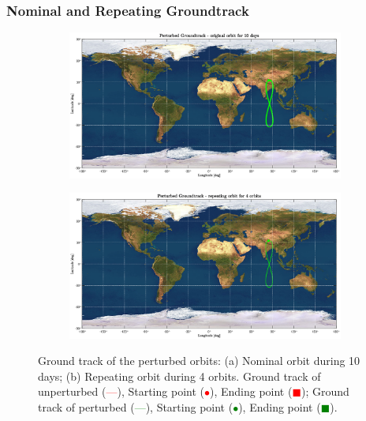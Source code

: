 \documentclass{article}
\newcommand{\reddashedline}{\textcolor{red}{---}}
\newcommand{\greendashedline}{\textcolor{green}{---}}
\begin{document}

\subsubsection{Nominal and Repeating Groundtrack}

\begin{figure}[H]
	\centering
	\begin{subfigure}[b]{0.45\textwidth}
		\includegraphics[width=\textwidth]{pg10d.eps}
		\caption{}
		\label{fig:1a}
	\end{subfigure}
	\hfill
	\begin{subfigure}[b]{0.45\textwidth}
		\includegraphics[width=\textwidth]{pgro4orb.eps}
		\caption{}
		\label{fig:1b}
	\end{subfigure}
	
	\caption{Ground track of the perturbed orbits: (a) Nominal orbit during 10 days; (b) Repeating orbit during 4 orbits. Ground track of unperturbed (\reddashedline), Starting point (\textcolor{red}{$\bullet$}), Ending point (\textcolor{red}{$\blacksquare$}); Ground track of perturbed (\greendashedline), Starting point (\textcolor{green}{$\bullet$}), Ending point (\textcolor{green}{$\blacksquare$}).
	}
\end{figure}
\end{document}
